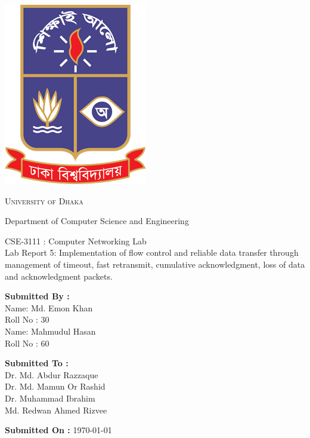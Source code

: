 \documentclass[11pt]{article}
\newcommand{\labNo}{5}
\newcommand{\labTitle}{Implementation of flow control and reliable data transfer through management of
timeout, fast retransmit, cumulative acknowledgment, loss of data and acknowledgment packets.}
\begin{document}
\begin{titlepage}
    \begin{center}
        \includegraphics[scale=0.35]{du_logo.png}\par
        \begin{Huge}
            \textsc{University of Dhaka}\par
        \end{Huge}
        \begin{Large}
            Department of Computer Science and Engineering\par \vspace{1cm}
            CSE-3111 : Computer Networking Lab \\[12pt]    
            Lab Report \labNo : \labTitle
        \end{Large}
    \end{center}
    
    \vfill
    
    \begin{large}
        \begin{multicols}{2}
            \textbf{Submitted By :\\[12pt]}
                Name: Md. Emon Khan\\[8pt]
                Roll No : 30\\[12pt]
                Name: Mahmudul Hasan\\[8pt]
                Roll No : 60\\[12pt]
                
            \columnbreak
            
            \noindent
            \textbf{Submitted To :\\[12pt]}
                Dr. Md. Abdur Razzaque\\[12pt]
                Dr. Md. Mamun Or Rashid\\[12pt]
                Dr. Muhammad Ibrahim\\[12pt]
                Md. Redwan Ahmed Rizvee
        \end{multicols}    
    \end{large} 
    
\textbf{Submitted On :} \today\\[20pt]

\end{titlepage}
\tableofcontents
\newpage
\end{document}
